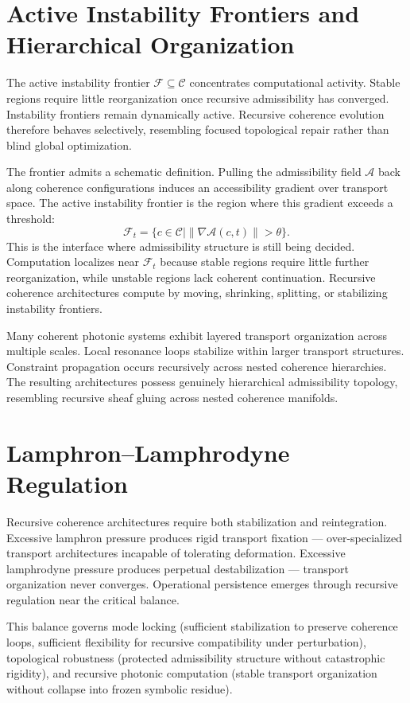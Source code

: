 \documentclass[11pt,openany]{book}
\theoremstyle{definition}
\theoremstyle{plain}
\newcommand{\Afield}{\mathcal{A}}
\newcommand{\Ffrontier}{\mathcal{F}}
\begin{document}
\section{Active Instability Frontiers and Hierarchical Organization}

The active instability frontier $\Ffrontier \subseteq \mathcal{C}$ concentrates computational activity. Stable regions require little reorganization once recursive admissibility has converged. Instability frontiers remain dynamically active. Recursive coherence evolution therefore behaves selectively, resembling focused topological repair rather than blind global optimization.

The frontier admits a schematic definition. Pulling the admissibility field $\Afield$ back along coherence configurations induces an accessibility gradient over transport space. The active instability frontier is the region where this gradient exceeds a threshold:
\[
\Ffrontier_t = \{c \in \mathcal{C} \mid \|\nabla \Afield(c,t)\| > \theta\}.
\]
This is the interface where admissibility structure is still being decided. Computation localizes near $\Ffrontier_t$ because stable regions require little further reorganization, while unstable regions lack coherent continuation. Recursive coherence architectures compute by moving, shrinking, splitting, or stabilizing instability frontiers.

Many coherent photonic systems exhibit layered transport organization across multiple scales. Local resonance loops stabilize within larger transport structures. Constraint propagation occurs recursively across nested coherence hierarchies. The resulting architectures possess genuinely hierarchical admissibility topology, resembling recursive sheaf gluing across nested coherence manifolds.

\section{Lamphron--Lamphrodyne Regulation}

Recursive coherence architectures require both stabilization and reintegration. Excessive lamphron pressure produces rigid transport fixation --- over-specialized transport architectures incapable of tolerating deformation. Excessive lamphrodyne pressure produces perpetual destabilization --- transport organization never converges. Operational persistence emerges through recursive regulation near the critical balance.

This balance governs mode locking (sufficient stabilization to preserve coherence loops, sufficient flexibility for recursive compatibility under perturbation), topological robustness (protected admissibility structure without catastrophic rigidity), and recursive photonic computation (stable transport organization without collapse into frozen symbolic residue).
\end{document}
